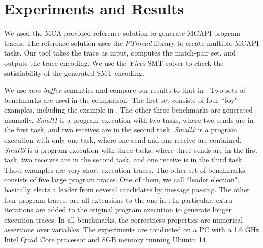 \section{Experiments and Results}
We used the MCA provided reference solution to generate MCAPI program traces. The reference solution uses the \textit{PThread} library to create multiple MCAPI tasks. Our tool takes the trace as input, computes the match-pair set, and outputs the trace encoding. We use the \textit{Yices} SMT solver \cite{dutertre:CAV06} to check the satisfiability of the generated SMT encoding.

We use \textit{zero-buffer} semantics and compare our results to that in \cite{elwakil:padtad10}.  Two sets of benchmarks are used in the comparison. The first set consists of four ``toy" examples, including the example in . The other three benchmarks are generated manually. \textit{Small1} is a program execution with two tasks, where two sends are in the first task, and two receives are in the second task.  \textit{Small2} is a program execution with only one task, where one send and one receive are contained.  \textit{Small3} is a program execution with three tasks, where three sends are in the first task, two receives are in the second task, and one receive is in the third task. Those examples are very short execution traces. The other set of benchmarks consists of five large program traces. One of them, we call ``leader election", basically elects a leader from several candidates by message passing. The other four program traces, are all extensions to the one in . In particular, extra iterations are added to the original program execution to generate longer execution traces. In all benchmarks, the correctness properties are numerical assertions over variables. The experiments are conducted on a PC with a 1.6 GHz Intel Quad Core processor and 8GB memory running Ubuntu 14.

